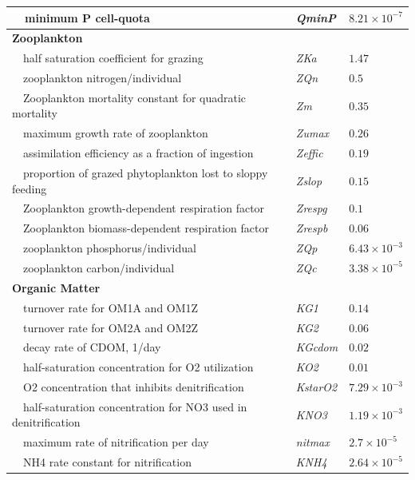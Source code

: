 \documentclass[letterpaper,12pt,oneside]{article}\usepackage[]{graphicx}\usepackage[]{color}
\begin{document}
\begin{table}[!tbp]
{\begin{center}
\begin{tabular}{lll}
~~minimum P cell-quota&\textit{QminP}&$8.21\times 10^{-7}$\tabularnewline
\hline
{\bfseries Zooplankton}&&\tabularnewline
~~half saturation coefficient for grazing&\textit{ZKa}&$1.47$\tabularnewline
~~zooplankton nitrogen/individual&\textit{ZQn}&$0.5$\tabularnewline
~~Zooplankton mortality constant for quadratic mortality&\textit{Zm}&$0.35$\tabularnewline
~~maximum growth rate of zooplankton&\textit{Zumax}&$0.26$\tabularnewline
~~assimilation efficiency as a fraction of ingestion&\textit{Zeffic}&$0.19$\tabularnewline
~~proportion of grazed phytoplankton lost to sloppy feeding&\textit{Zslop}&$0.15$\tabularnewline
~~Zooplankton growth-dependent respiration factor&\textit{Zrespg}&$0.1$\tabularnewline
~~Zooplankton biomass-dependent respiration factor&\textit{Zrespb}&$0.06$\tabularnewline
~~zooplankton phosphorus/individual&\textit{ZQp}&$6.43\times 10^{-3}$\tabularnewline
~~zooplankton carbon/individual&\textit{ZQc}&$3.38\times 10^{-5}$\tabularnewline
\hline
{\bfseries Organic Matter}&&\tabularnewline
~~turnover rate for OM1A and OM1Z&\textit{KG1}&$0.14$\tabularnewline
~~turnover rate for OM2A and OM2Z&\textit{KG2}&$0.06$\tabularnewline
~~decay rate of CDOM, 1/day&\textit{KGcdom}&$0.02$\tabularnewline
~~half-saturation concentration for O2 utilization&\textit{KO2}&$0.01$\tabularnewline
~~O2 concentration that inhibits denitrification&\textit{KstarO2}&$7.29\times 10^{-3}$\tabularnewline
~~half-saturation concentration for NO3 used in denitrification&\textit{KNO3}&$1.19\times 10^{-3}$\tabularnewline
~~maximum rate of nitrification per day&\textit{nitmax}&$2.7\times 10^{-5}$\tabularnewline
~~NH4 rate constant for nitrification&\textit{KNH4}&$2.64\times 10^{-5}$\tabularnewline
\hline
\end{tabular}\end{center}}

\end{table}


\clearpage

\end{document}
